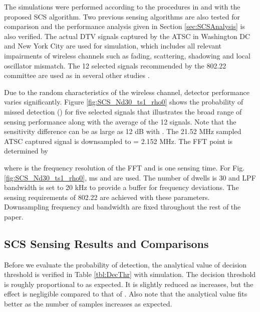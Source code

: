 \documentclass[draftclsnofoot,onecolumn,12pt]{IEEEtran}
\begin{document}
The simulations were performed according to the procedures in \cite{802.22_Sim_model} and
\cite{802.22:InitialSigProc} with the proposed SCS algorithm. Two previous sensing algorithms are
also tested for comparison and the performance analysis given in Section \ref{sec:SCSAnalysis} is also verified.
The actual DTV signals captured by the ATSC in
Washington DC and New York City are used for simulation, which includes all relevant impairments of
wireless channels such as fading, scattering, shadowing and local oscillator mismatch. The
12 selected signals recommended by the 802.22 committee \cite{802.22_Sim_model} are used as in several other studies \cite{CorGho07, ZenLia09, CheGao07}.



Due to the random
characteristics of the wireless channel, detector performance varies significantly.
Figure \ref{fig:SCS_Nd30_ts1_rho0} shows the probability of missed detection () for five selected signals that illustrates the broad range of sensing performance along with the average of the 12 signals.
Note that the sensitivity difference
can be as large as 12 dB with . The 21.52 MHz sampled ATSC captured signal is
downsampled to  = 2.152 MHz. The FFT point  is determined by

where  is the frequency resolution of the FFT and  is one sensing time.
For Fig.  \ref{fig:SCS_Nd30_ts1_rho0},  ms and  are used. The number of dwells  is 30 and LPF bandwidth  is set to 20 kHz to provide a buffer for
frequency deviations. The sensing requirements of 802.22 are achieved with these parameters.
Downsampling frequency  and bandwidth  are fixed throughout the rest of the paper.

\subsection{SCS Sensing Results and Comparisons}
\label{subsec:SimResults}


Before we evaluate the probability of detection, the analytical value of decision threshold is verified in Table \ref{tbl:DecThr} with simulation.
The decision threshold  is roughly proportional to  as expected. It is slightly reduced as  increases, but the effect is negligible compared to that of . Also note that the analytical value fits better as the number of samples increases as expected.
\end{document}
